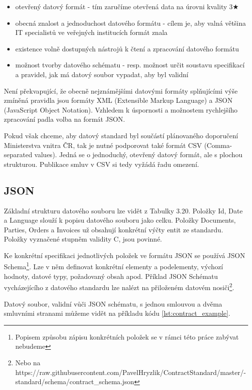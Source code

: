 \begin{itemize}
\item otevřený datový formát - tím zaručíme otevřená data na úrovni kvality 3$\bigstar$
\item obecná znalost a jednoduchost datového formátu - cílem je, aby valná většina IT specialistů ve veřejných institucích formát znala
\item existence volně dostupných nástrojů k čtení a zpracování datového formátu
\item možnost tvorby datového schématu - resp. možnost určit soustavu specifikací a pravidel, jak má datový soubor vypadat, aby byl validní
\end{itemize}

Není překvapující, že obecně nejznámějšími datovými formáty splňujícími výše zmíněná pravidla jsou formáty XML (Extensible Markup Language) a JSON (JavaScript Object Notation)\cite{JSON}. Vzhledem k úspornosti a možnostem rychlejšího zpracování padla volba na formát JSON.

Pokud však chceme, aby datový standard byl součástí plánovaného doporučení Ministerstva vnitra ČR, tak je nutné podporovat také formát CSV (Comma-separated values)\cite{CSV}. Jedná se o jednoduchý, otevřený datový formát, ale s plochou strukturou. Publikace smluv v CSV si tedy vyžádá řadu omezení. 

\subsection{JSON}

Základní strukturu datového souboru lze vidět z Tabulky 3.20. Položky Id, Date a Language slouží k popisu datového souboru jako celku. Položky Documents, Parties, Orders a Invoices už obsahují konkrétní výčty entit ze standardu. Položky vyznačené stupněm validity C, jsou povinné.

Ke konkrétní specifikaci jednotlivých položek ve formátu JSON se používá JSON Schema\cite{JSONSchema}\footnote{Popisem způsobu zápisu konkrétních položek se v rámci této práce zabývat nebudeme}. Lze v něm definovat konkrétní elementy a podelementy, výchozí hodnoty, datové typy, požadovaný obsah apod. Příklad JSON Schématu vycházejícího z datového standardu lze nalézt na přiloženém datovém nosiči\footnote{Nebo na https://raw.githubusercontent.com/PavelHryzlik/ContractStandard/master/- standard/schema/contract\_schema.json}.

Datový soubor, validní vůči JSON schématu, s jednou smlouvou a dvěma smluvními stranami můžeme vidět na příkladu kódu \ref{lst:contract_example}.

